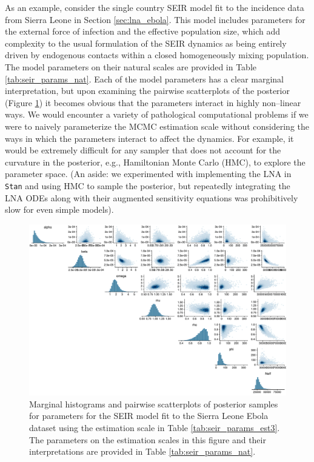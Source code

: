 As an example, consider the single country SEIR model fit to the incidence data from Sierra Leone in Section \ref{sec:lna_ebola}. This model includes parameters for the external force of infection and the effective population size, which add complexity to the usual formulation of the SEIR dynamics as being entirely driven by endogenous contacts within a closed homogeneously mixing population. The model parameters on their natural scales are provided in Table \ref{tab:seir_params_nat}. Each of the model parameters has a clear marginal interpretation, but upon examining the pairwise scatterplots of the posterior (Figure \ref{fig:slpairs1}) it becomes obvious that the parameters interact in highly non--linear ways. We would encounter a variety of pathological computational problems if we were to naively parameterize the MCMC estimation scale without considering the ways in which the parameters interact to affect the dynamics. For example, it would be extremely difficult for any sampler that does not account for the curvature in the posterior, e.g., Hamiltonian Monte Carlo (HMC), to explore the parameter space. (An aside: we experimented with implementing the LNA in \texttt{Stan} and using HMC to sample the posterior, but repeatedly integrating the LNA ODEs along with their augmented sensitivity equations was prohibitively slow for even simple models).  

\begin{figure}[htbp]
	\centering
	\includegraphics[width=\linewidth]{figures/sln_pairs_nat}
	\caption[Posterior scatterplots for Sierra Leone SEIR model parameters on their natural scales.]{Marginal histograms and pairwise scatterplots of posterior samples for parameters for the SEIR model fit to the Sierra Leone Ebola dataset using the estimation scale in Table \ref{tab:seir_params_est3}. The parameters on the estimation scales in this figure and their interpretations are provided in Table \ref{tab:seir_params_nat}.} 
	\label{fig:slpairs1}
\end{figure}

